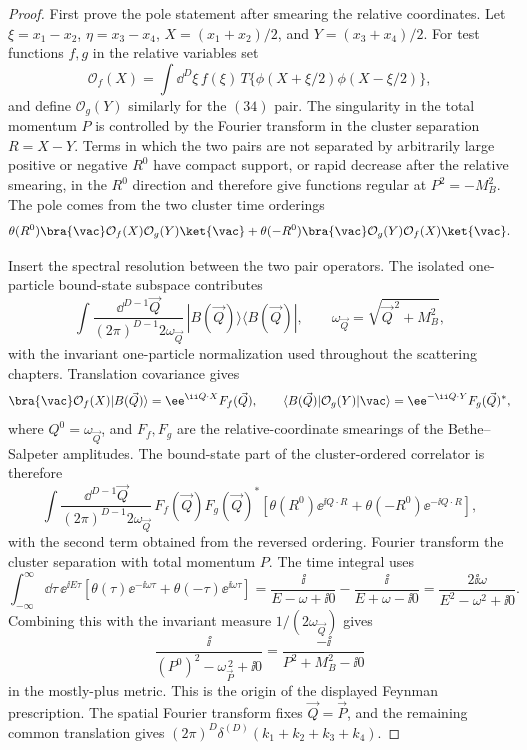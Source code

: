 \begin{proof}
First prove the pole statement after smearing the relative coordinates.  Let
\(\xi=x_1-x_2\), \(\eta=x_3-x_4\), \(X=(x_1+x_2)/2\), and
\(Y=(x_3+x_4)/2\).  For test functions \(f,g\) in the relative variables set
\[
  \mathcal O_f(X)
  =
  \int\dd^D\xi\,f(\xi)\,
  T\{\phi(X+\xi/2)\phi(X-\xi/2)\},
\]
and define \(\mathcal O_g(Y)\) similarly for the \((34)\) pair.  The
singularity in the total momentum \(P\) is controlled by the Fourier transform
in the cluster separation \(R=X-Y\).  Terms in which the two pairs are not
separated by arbitrarily large positive or negative \(R^0\) have compact
support, or rapid decrease after the relative smearing, in the \(R^0\)
direction and therefore give functions regular at \(P^2=-M_B^2\).  The pole
comes from the two cluster time orderings
\[
  \theta(R^0)\bra{\vac}\mathcal O_f(X)\mathcal O_g(Y)\ket{\vac}
  +
  \theta(-R^0)\bra{\vac}\mathcal O_g(Y)\mathcal O_f(X)\ket{\vac}.
\]

Insert the spectral resolution between the two pair operators.  The isolated
one-particle bound-state subspace contributes
\[
  \int
  \frac{\dd^{D-1}\vec Q}{(2\pi)^{D-1}2\omega_{\vec Q}}\,
  |B(\vec Q)\rangle\langle B(\vec Q)|,
  \qquad
  \omega_{\vec Q}=\sqrt{\vec Q^{\,2}+M_B^2},
\]
with the invariant one-particle normalization used throughout the scattering
chapters.  Translation covariance gives
\[
  \bra{\vac}\mathcal O_f(X)|B(\vec Q)\rangle
  =
  \ee^{\ii Q\cdot X}
  F_f(\vec Q),
  \qquad
  \langle B(\vec Q)|\mathcal O_g(Y)|\vac\rangle
  =
  \ee^{-\ii Q\cdot Y}
  F_g(\vec Q)^*,
\]
where \(Q^0=\omega_{\vec Q}\), and \(F_f,F_g\) are the relative-coordinate
smearings of the Bethe--Salpeter amplitudes.  The bound-state part of the
cluster-ordered correlator is therefore
\[
  \int
  \frac{\dd^{D-1}\vec Q}{(2\pi)^{D-1}2\omega_{\vec Q}}\,
  F_f(\vec Q)F_g(\vec Q)^*
  \left[
    \theta(R^0)\ee^{\ii Q\cdot R}
    +
    \theta(-R^0)\ee^{-\ii Q\cdot R}
  \right],
\]
with the second term obtained from the reversed ordering.  Fourier transform
the cluster separation with total momentum \(P\).  The time integral uses
\begin{equation}
  \int_{-\infty}^{\infty}\dd\tau\,\ee^{\ii E\tau}
  \left[
    \theta(\tau)\ee^{-\ii\omega\tau}
    +
    \theta(-\tau)\ee^{\ii\omega\tau}
  \right]
  =
  \frac{\ii}{E-\omega+\ii0}
  -
  \frac{\ii}{E+\omega-\ii0}
  =
  \frac{2\ii\omega}{E^2-\omega^2+\ii0}.
  \label{eq:bs-time-ordering-feynman-pole}
\end{equation}
Combining this with the invariant measure \(1/(2\omega_{\vec Q})\) gives
\[
  \frac{\ii}{(P^0)^2-\omega_{\vec P}^{\,2}+\ii0}
  =
  \frac{-\ii}{P^2+M_B^2-\ii0}
\]
in the mostly-plus metric.  This is the origin of the displayed Feynman
prescription.  The spatial Fourier transform fixes \(\vec Q=\vec P\), and
the remaining common translation gives
\((2\pi)^D\delta^{(D)}(k_1+k_2+k_3+k_4)\).


\end{proof}
